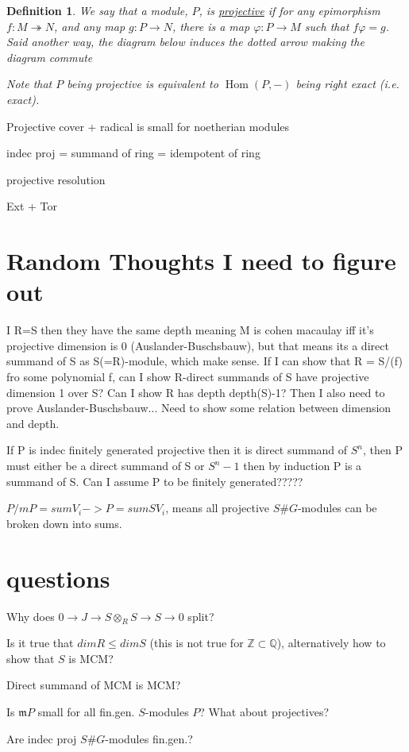 \documentclass[11pt, a4paper, english]{article}
\numberwithin{prop}{section}
\numberwithin{lemma}{section}
\numberwithin{theorem}{section}
\newtheorem{defin}{Definition}
\numberwithin{defin}{section}
\numberwithin{example}{section}
\DeclareMathOperator{\Hom}{Hom}
\begin{document}
\begin{appendices}
\begin{defin}
We say that a module, $P$, is \underline{projective} if for any epimorphism $f: M \twoheadrightarrow N$, and any map $g: P \to N$, there is a map $\varphi: P \to M$ such that $f \varphi = g$. Said another way, the diagram below induces the dotted arrow making the diagram commute
\begin{center}
\end{center} 
Note that $P$ being projective is equivalent to $\Hom(P, -)$ being right exact (i.e. exact).
\end{defin}

Projective cover + radical is  small for noetherian modules

indec proj = summand of ring = idempotent of ring

projective resolution

Ext + Tor
\end{appendices}

\section{Random Thoughts I need to figure out}
I R=S then they have the same depth meaning M is cohen macaulay iff it's projective dimension is 0 (Auslander-Buschsbauw), but that means its a direct summand of S as S(=R)-module, which make sense. If I can show that R = S/(f) fro some polynomial f, can I show R-direct summands of S have projective dimension 1 over S? Can I show R has depth depth(S)-1? Then I also need to prove Auslander-Buschsbauw... Need to show some relation between dimension and depth.

If P is indec finitely generated projective then it is direct summand of $S^n$, then P must either be a direct summand of S or $S^n-1$ then by induction P is a  summand of S. Can I assume P to be finitely generated?????

$P/mP = sum V_i -> P = sum SV_i$, means  all projective $S\#G$-modules can be broken down into sums.

\section{questions}
Why does $0 \to J \to S \otimes_R S \to S \to 0$ split?

Is it true that $dim R \leq dim S$ (this is not true for $\mathbb{Z} \subset \mathbb{Q}$), alternatively how to show that $S$ is MCM?

Direct summand of MCM is MCM?

Is $\mathfrak{m} P$ small for all fin.gen. $S$-modules $P$? What about projectives?

Are indec proj $S\#G$-modules fin.gen.?



\nocite{*}


\end{document}
